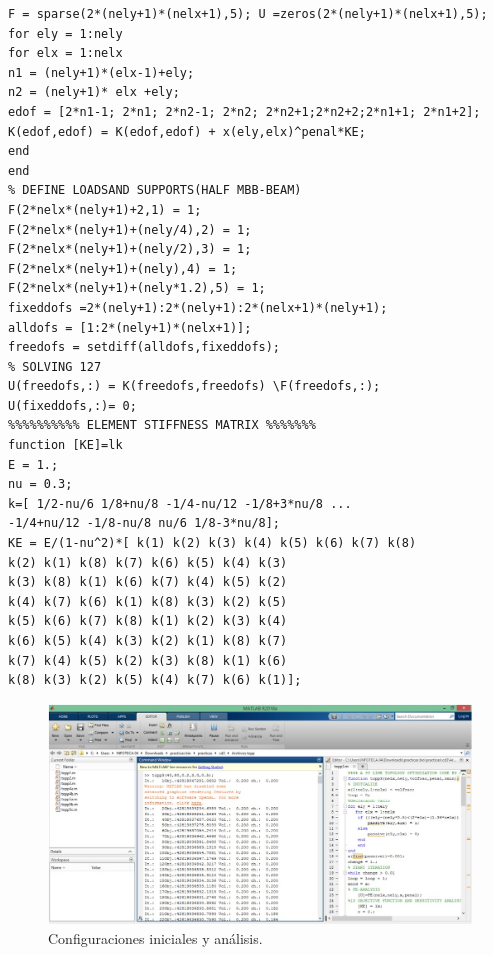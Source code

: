\documentclass{article}
\begin{document}
\begin{lstlisting}
F = sparse(2*(nely+1)*(nelx+1),5); U =zeros(2*(nely+1)*(nelx+1),5);
for ely = 1:nely
for elx = 1:nelx
n1 = (nely+1)*(elx-1)+ely;
n2 = (nely+1)* elx +ely;
edof = [2*n1-1; 2*n1; 2*n2-1; 2*n2; 2*n2+1;2*n2+2;2*n1+1; 2*n1+2];
K(edof,edof) = K(edof,edof) + x(ely,elx)^penal*KE;
end
end
% DEFINE LOADSAND SUPPORTS(HALF MBB-BEAM)
F(2*nelx*(nely+1)+2,1) = 1;
F(2*nelx*(nely+1)+(nely/4),2) = 1;
F(2*nelx*(nely+1)+(nely/2),3) = 1;
F(2*nelx*(nely+1)+(nely),4) = 1;
F(2*nelx*(nely+1)+(nely*1.2),5) = 1;
fixeddofs =2*(nely+1):2*(nely+1):2*(nelx+1)*(nely+1);
alldofs = [1:2*(nely+1)*(nelx+1)];
freedofs = setdiff(alldofs,fixeddofs);
% SOLVING 127
U(freedofs,:) = K(freedofs,freedofs) \F(freedofs,:);
U(fixeddofs,:)= 0;
%%%%%%%%%% ELEMENT STIFFNESS MATRIX %%%%%%%
function [KE]=lk
E = 1.;
nu = 0.3;
k=[ 1/2-nu/6 1/8+nu/8 -1/4-nu/12 -1/8+3*nu/8 ...
-1/4+nu/12 -1/8-nu/8 nu/6 1/8-3*nu/8];
KE = E/(1-nu^2)*[ k(1) k(2) k(3) k(4) k(5) k(6) k(7) k(8)
k(2) k(1) k(8) k(7) k(6) k(5) k(4) k(3)
k(3) k(8) k(1) k(6) k(7) k(4) k(5) k(2)
k(4) k(7) k(6) k(1) k(8) k(3) k(2) k(5)
k(5) k(6) k(7) k(8) k(1) k(2) k(3) k(4)
k(6) k(5) k(4) k(3) k(2) k(1) k(8) k(7)
k(7) k(4) k(5) k(2) k(3) k(8) k(1) k(6)
k(8) k(3) k(2) k(5) k(4) k(7) k(6) k(1)];
\end{lstlisting}
\begin{figure}[htp] %
    \centering
    \includegraphics[width=125mm]{Resultado.jpeg} %
    \caption{Configuraciones iniciales y análisis.}
    \label{grafica}
\end{figure}
\newpage
\end{document}
